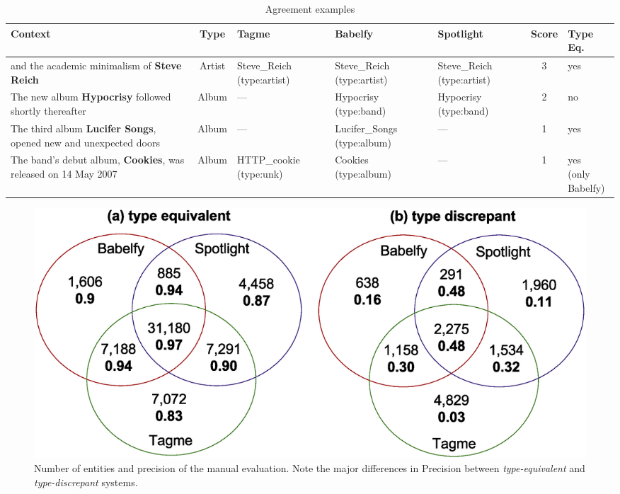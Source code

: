 \begin{table}[!t]
\scriptsize
\def\arraystretch{1.2}
\centering
	\begin{tabular}{| p{2cm} | c | L{1.8cm} | L{1.8cm} | L{1.5cm} | c | L{1cm} |}
\hline
\textbf{Context} & \textbf{Type} & \textbf{Tagme} & \textbf{Babelfy} & \textbf{Spotlight} & \textbf{Score} & \textbf{Type Eq.} \\
\hline
and the academic minimalism of \textbf{Steve Reich} & Artist &  Steve\_Reich (type:artist) & Steve\_Reich (type:artist) & Steve\_Reich (type:artist) & 3 & yes \\
\hline
The new album \textbf{Hypocrisy} followed shortly thereafter & Album & --- & Hypocrisy (type:band) & Hypocrisy (type:band) & 2 & no \\
\hline
The third album \textbf{Lucifer Songs}, opened new and unexpected doors & Album & --- & Lucifer\_Songs (type:album) & --- & 1 & yes \\
\hline
The band's debut album, \textbf{Cookies}, was released on 14 May 2007 & Album & HTTP\_cookie {\footnotesize{(type:unk)}} & Cookies (type:album) & --- & 1 & \parbox[t]{1cm}{\centering yes\\ (only\\ Babelfy)} \\
\hline
	\end{tabular}
	\caption{Agreement examples}
	\label{tbl:linking:examples}
\end{table}



\begin{figure}[!t]
  \centering
	\includegraphics[width=\textwidth]{ch03_linking_pics/evaluation_both.eps}
  \caption{Number of entities and precision of the manual evaluation.  Note the major differences in Precision between \textit{type-equivalent} and \textit{type-discrepant} systems.}
  \label{fig:linking:agreement_typed}
\end{figure}

